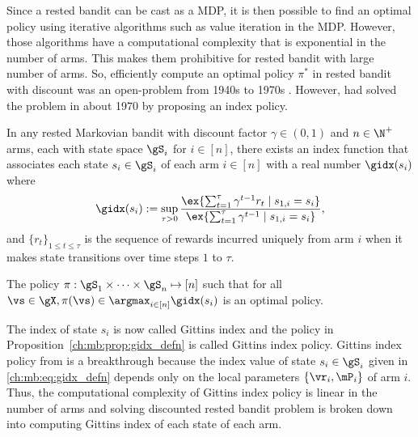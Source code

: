 Since a rested bandit can be cast as a MDP, it is then possible to find an optimal policy using iterative algorithms such as value iteration in the MDP.
However, those algorithms have a computational complexity that is exponential in the number of arms.
This makes them prohibitive for rested bandit with large number of arms.
So, efficiently compute an optimal policy $\pi^*$ in rested bandit with discount was an open-problem from 1940s to 1970s \cite{whittle1996optimal}.
However, \cite{gittins1979bandit} had solved the problem in about 1970 by proposing an index policy.
\begin{prop}
    \label{ch:mb:prop:gidx_defn}
    In any rested Markovian bandit with discount factor $\gamma\in(0,1)$ and $n\in\N^+$ arms, each with state space $\gS_i$ for $i\in[n]$, there exists an index function that associates each state $s_i\in\gS_i$ of each arm $i\in[n]$ with a real number $\gidx(s_i)$ where
    \begin{equation}
        \label{ch:mb:eq:gidx_defn}
        \gidx(s_i):=\sup_{\tau>0}\frac{\ex{\sum_{t=1}^{\tau}\gamma^{t-1}r_t \mid s_{1,i}=s_i}}{\ex{\sum_{t=1}^{\tau}\gamma^{t-1}\mid s_{1,i}=s_i}}, 
    \end{equation}
    and $\{r_t\}_{1\le t\le\tau}$ is the sequence of rewards incurred uniquely from arm $i$ when it makes state transitions over time steps $1$ to $\tau$.

    The policy $\pi:\gS_1\times\dots\times\gS_n\mapsto[n]$ such that for all $\vs\in\gX, \pi(\vs)\in\argmax_{i\in[n]}\gidx(s_i)$ is an optimal policy.
\end{prop}
The index of state $s_i$ is now called Gittins index and the policy in Proposition~\ref{ch:mb:prop:gidx_defn} is called Gittins index policy.
Gittins index policy from \cite{gittins1979bandit} is a breakthrough because the index value of state $s_i\in\gS_i$ given in \eqref{ch:mb:eq:gidx_defn} depends only on the local parameters $\{\vr_i,\mP_i\}$ of arm $i$.
Thus, the computational complexity of Gittins index policy is linear in the number of arms and solving discounted rested bandit problem is broken down into computing Gittins index of each state of each arm.

